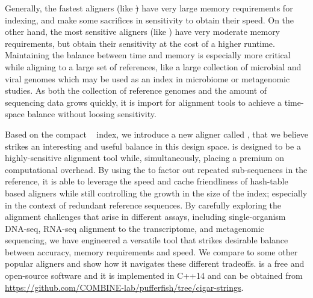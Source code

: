 Generally, the fastest aligners (like \st) have very large memory requirements for indexing, and make 
some sacrifices in sensitivity to obtain their speed. On the other hand, the most sensitive aligners (like
\bt) have very moderate memory requirements, but obtain their sensitivity at the cost of a higher runtime. 
Maintaining the balance between time and memory is especially more critical while aligning 
to a large set of references, like a large collection of microbial  and viral genomes which may 
be used as an index in microbiome or metagenomic studies. As both the collection of reference genomes and 
the amount of sequencing data grows quickly, it is import for alignment tools to achieve a time-space balance 
without loosing sensitivity.

Based on the compact \pufferfish~\citep{pufferfish} index, we introduce a new aligner called \puffaligner,
that we believe strikes an interesting and useful balance in this design space. \puffaligner is designed 
to be a highly-sensitive alignment tool while, simultaneously, placing a premium on computational overhead.
By using the \ccdbg to factor out repeated sub-sequences in the reference, it is able to leverage the speed 
and cache friendliness of hash-table based aligners while still controlling 
the growth in the size of the index; especially in the context of redundant reference sequences. By carefully 
exploring the alignment challenges that arise in different assays, including single-organism DNA-seq, 
RNA-seq alignment to the transcriptome, and metagenomic sequencing, we have engineered a versatile
tool that strikes desirable balance between accuracy, memory requirements and speed. We compare 
\puffaligner to some other popular aligners and show how it navigates these different tradeoffs. 
\puffaligner is a free and open-source software and it is implemented in C++14 and can be obtained 
from \url{https://github.com/COMBINE-lab/pufferfish/tree/cigar-strings}.

